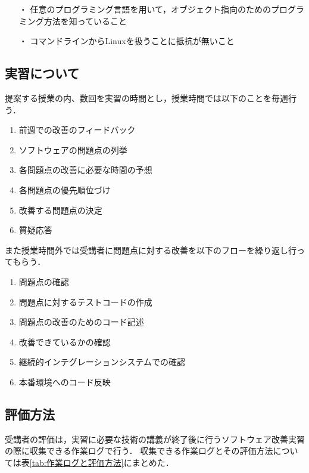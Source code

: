 \begin{itemize}
  \item[・] 任意のプログラミング言語を用いて，オブジェクト指向のためのプログラミング方法を知っていること
  \item[・] コマンドラインからLinuxを扱うことに抵抗が無いこと
\end{itemize}

\subsection{実習について}

提案する授業の内、数回を実習の時間とし，授業時間では以下のことを毎週行う．

\begin{enumerate}
  \item 前週での改善のフィードバック
  \item ソフトウェアの問題点の列挙
  \item 各問題点の改善に必要な時間の予想
  \item 各問題点の優先順位づけ
  \item 改善する問題点の決定
  \item 質疑応答
\end{enumerate}

また授業時間外では受講者に問題点に対する改善を以下のフローを繰り返し行ってもらう．

\begin{enumerate}
  \item 問題点の確認
  \item 問題点に対するテストコードの作成
  \item 問題点の改善のためのコード記述
  \item 改善できているかの確認
  \item 継続的インテグレーションシステムでの確認
  \item 本番環境へのコード反映
\end{enumerate}

\subsection{評価方法}

受講者の評価は，実習に必要な技術の講義が終了後に行うソフトウェア改善実習の際に収集できる作業ログで行う．
収集できる作業ログとその評価方法については表\ref{tab:作業ログと評価方法}にまとめた．

